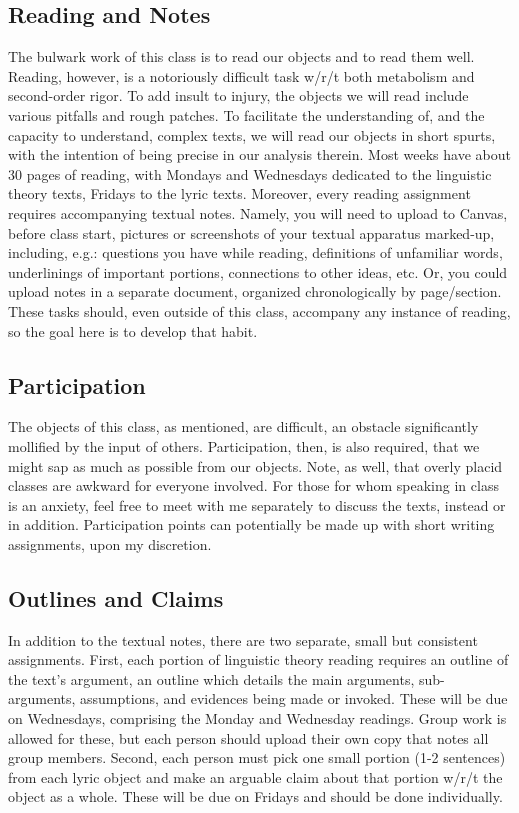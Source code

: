 \documentclass[12pt]{article}
\begin{document}
\subsection{Reading and Notes}
The bulwark work of this class is to read our objects and to read them well. Reading, however, is a notoriously difficult task w/r/t both metabolism and second-order rigor. To add insult to injury, the objects we will read include various pitfalls and rough patches. To facilitate the understanding of, and the capacity to understand, complex texts, we will read our objects in short spurts, with the intention of being precise in our analysis therein. Most weeks have about 30 pages of reading, with Mondays and Wednesdays dedicated to the linguistic theory texts, Fridays to the lyric texts. Moreover, every reading assignment requires accompanying textual notes. Namely, you will need to upload to Canvas, before class start, pictures or screenshots of your textual apparatus marked-up, including, e.g.: questions you have while reading, definitions of unfamiliar words, underlinings of important portions, connections to other ideas, etc. Or, you could upload notes in a separate document, organized chronologically by page/section. These tasks should, even outside of this class, accompany any instance of reading, so the goal here is to develop that habit.

\subsection{Participation}
The objects of this class, as mentioned, are difficult, an obstacle significantly mollified by the input of others. Participation, then, is also required, that we might sap as much as possible from our objects. Note, as well, that overly placid classes are awkward for everyone involved. For those for whom speaking in class is an anxiety, feel free to meet with me separately to discuss the texts, instead or in addition. Participation points can potentially be made up with short writing assignments, upon my discretion.

\subsection{Outlines and Claims}
In addition to the textual notes, there are two separate, small but consistent assignments. First, each portion of linguistic theory reading requires an outline of the text's argument, an outline which details the main arguments, sub-arguments, assumptions, and evidences being made or invoked. These will be due on Wednesdays, comprising the Monday and Wednesday readings. Group work is allowed for these, but each person should upload their own copy that notes all group members. Second, each person must pick one small portion (1-2 sentences) from each lyric object and make an arguable claim about that portion w/r/t the object as a whole. These will be due on Fridays and should be done individually.
\end{document}
